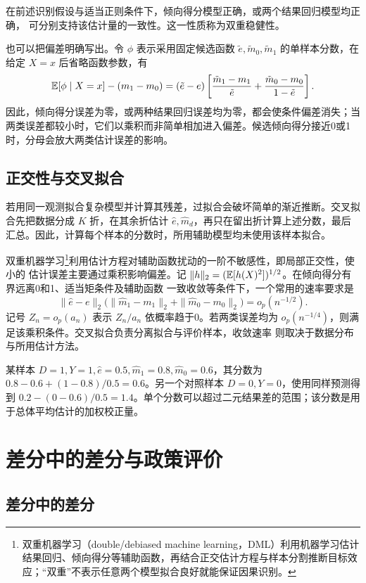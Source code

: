 在前述识别假设与适当正则条件下，倾向得分模型正确，或两个结果回归模型均正确，
可分别支持该估计量的一致性。这一性质称为双重稳健性。

也可以把偏差明确写出。令 \(\phi\) 表示采用固定候选函数 \(\tilde e,\tilde m_0,\tilde m_1\) 的单样本分数，在给定 \(X=x\) 后省略函数参数，有
\[
\mathbb E[\phi\mid X=x]-(m_1-m_0)
=(\tilde e-e)\left[
\frac{\tilde m_1-m_1}{\tilde e}
+\frac{\tilde m_0-m_0}{1-\tilde e}\right].
\]
因此，倾向得分误差为零，或两种结果回归误差均为零，都会使条件偏差消失；当两类误差都较小时，它们以乘积而非简单相加进入偏差。候选倾向得分接近0或1时，分母会放大两类估计误差的影响。

\subsection{正交性与交叉拟合}
若用同一观测拟合复杂模型并计算其残差，过拟合会破坏简单的渐近推断。交叉拟合先把数据分成 \(K\) 折，在其余折估计 \(\hat e,\hat m_d\)，再只在留出折计算上述分数，最后汇总。因此，计算每个样本的分数时，所用辅助模型均未使用该样本拟合。

双重机器学习\footnote{双重机器学习（double/debiased machine learning，DML）利用机器学习估计结果回归、倾向得分等辅助函数，再结合正交估计方程与样本分割推断目标效应；“双重”不表示任意两个模型拟合良好就能保证因果识别。}利用估计方程对辅助函数扰动的一阶不敏感性，即局部正交性，使小的
估计误差主要通过乘积影响偏差\cite{dml08}。记
\(\|h\|_2=(\mathbb E[h(X)^2])^{1/2}\)。在倾向得分有界远离0和1、适当矩条件及辅助函数
一致收敛等条件下，一个常用的速率要求是
\[
\|\hat e-e\|_2\bigl(\|\hat m_1-m_1\|_2+\|\hat m_0-m_0\|_2\bigr)
=o_p(n^{-1/2}).
\]
记号 \(Z_n=o_p(a_n)\) 表示 \(Z_n/a_n\) 依概率趋于0。若两类误差均为
\(o_p(n^{-1/4})\)，则满足该乘积条件。交叉拟合负责分离拟合与评价样本，收敛速率
则取决于数据分布与所用估计方法。

\begin{example}[单个双重稳健分数]
某样本 \(D=1,Y=1,\hat e=0.5,\hat m_1=0.8,\hat m_0=0.6\)，其分数为 \(0.8-0.6+(1-0.8)/0.5=0.6\)。另一个对照样本 \(D=0,Y=0\)，使用同样预测得到 \(0.2-(0-0.6)/0.5=1.4\)。单个分数可以超过二元结果差的范围；该分数是用于总体平均估计的加权校正量。
\end{example}

\section{差分中的差分与政策评价}
\subsection{差分中的差分}

